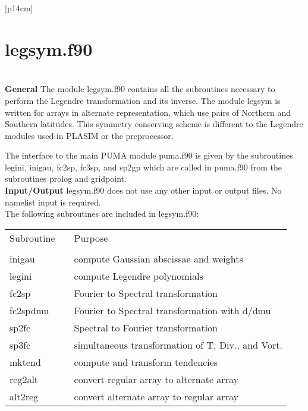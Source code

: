 
\begin{center}
\begin{tabular}{|p{14cm}|}
\hline
\vspace{-5mm} \section{legsym.f90} \vspace{-5mm} \\
\hline
\vspace{1mm} {\bf General} The module {\module legsym.f90}
 contains all the subroutines
necessary to perform the Legendre transformation and its inverse.
The module legsym is written for arrays in alternate representation,
which use pairs of Northern and Southern latitudes. This symmetry conserving
scheme is different to the Legendre modules used in PLASIM or the preprocessor.

 The interface to the main
PUMA module {\module puma.f90} is given by the subroutines {\sub legini}, {\sub
inigau}, {\sub fc2sp}, {\sub fc3sp}, and {\sub sp2gp}
 which are called in {\module puma.f90}
from the subroutines {\sub prolog} and {\sub gridpoint}.
\vspace{3mm} \\
\hline
\vspace{1mm} {\bf Input/Output} {\module legsym.f90}
 does not use any other input or output files. No namelist input is required. 
 \vspace{3mm} \\
\hline
\vspace{1mm}
The following subroutines are included in {\module legsym.f90}:

\begin{center}
\begin{tabular}{l p{2cm} l}
Subroutine & &Purpose \\
&& \\
{\sub inigau} && compute Gaussian abscissae and weights \\
{\sub legini} && compute Legendre polynomials \\
{\sub fc2sp}  && Fourier to Spectral transformation \\
{\sub fc2spdmu}  && Fourier to Spectral transformation with d/dmu \\
{\sub sp2fc}  && Spectral to Fourier transformation \\
{\sub sp3fc}  && simultaneous transformation of T, Div., and Vort. \\
{\sub mktend} && compute and transform tendencies \\
{\sub reg2alt} && convert regular array to alternate array \\
{\sub alt2reg} && convert alternate array to regular array \\
\end{tabular}
\end{center}
\vspace{3mm} \\
\hline
\end{tabular}
\end{center}
\newpage

